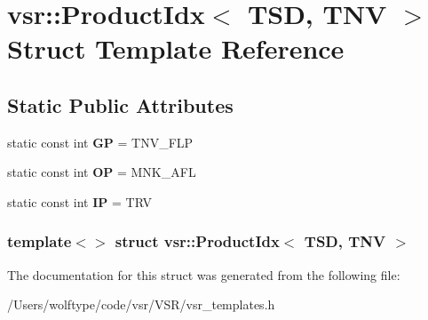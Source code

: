 \hypertarget{structvsr_1_1_product_idx_3_01_t_s_d_00_01_t_n_v_01_4}{\section{vsr\-:\-:Product\-Idx$<$ T\-S\-D, T\-N\-V $>$ Struct Template Reference}
\label{structvsr_1_1_product_idx_3_01_t_s_d_00_01_t_n_v_01_4}
}
\subsection*{Static Public Attributes}
\begin{DoxyCompactItemize}
\item 
\hypertarget{structvsr_1_1_product_idx_3_01_t_s_d_00_01_t_n_v_01_4_af5347895ccede150a5da7ae3b7640ddc}{static const int {\bfseries G\-P} = T\-N\-V\-\_\-\-F\-L\-P}\label{structvsr_1_1_product_idx_3_01_t_s_d_00_01_t_n_v_01_4_af5347895ccede150a5da7ae3b7640ddc}

\item 
\hypertarget{structvsr_1_1_product_idx_3_01_t_s_d_00_01_t_n_v_01_4_a441cd22a117763be167fce06ebb5242a}{static const int {\bfseries O\-P} = M\-N\-K\-\_\-\-A\-F\-L}\label{structvsr_1_1_product_idx_3_01_t_s_d_00_01_t_n_v_01_4_a441cd22a117763be167fce06ebb5242a}

\item 
\hypertarget{structvsr_1_1_product_idx_3_01_t_s_d_00_01_t_n_v_01_4_a80123b94904204340b08b3196d772bf9}{static const int {\bfseries I\-P} = T\-R\-V}\label{structvsr_1_1_product_idx_3_01_t_s_d_00_01_t_n_v_01_4_a80123b94904204340b08b3196d772bf9}

\end{DoxyCompactItemize}
\subsubsection*{template$<$$>$ struct vsr\-::\-Product\-Idx$<$ T\-S\-D, T\-N\-V $>$}



The documentation for this struct was generated from the following file\-:\begin{DoxyCompactItemize}
\item 
/\-Users/wolftype/code/vsr/\-V\-S\-R/vsr\-\_\-templates.\-h\end{DoxyCompactItemize}
